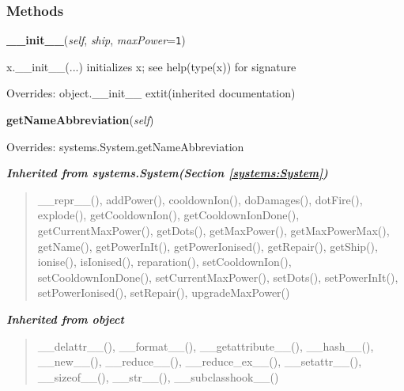   \subsubsection{Methods}

    \vspace{0.5ex}

\hspace{.8\funcindent}\begin{boxedminipage}{\funcwidth}

    \raggedright \textbf{\_\_init\_\_}(\textit{self}, \textit{ship}, \textit{maxPower}={\tt 1})

\setlength{\parskip}{2ex}
    x.\_\_init\_\_(...) initializes x; see help(type(x)) for signature

\setlength{\parskip}{1ex}
      Overrides: object.\_\_init\_\_ 	extit{(inherited documentation)}

    \end{boxedminipage}

    \vspace{0.5ex}

\hspace{.8\funcindent}\begin{boxedminipage}{\funcwidth}

    \raggedright \textbf{getNameAbbreviation}(\textit{self})

\setlength{\parskip}{2ex}
\setlength{\parskip}{1ex}
      Overrides: systems.System.getNameAbbreviation

    \end{boxedminipage}


\large{\textbf{\textit{Inherited from systems.System\textit{(Section \ref{systems:System})}}}}

\begin{quote}
\_\_repr\_\_(), addPower(), cooldownIon(), doDamages(), dotFire(), explode(), getCooldownIon(), getCooldownIonDone(), getCurrentMaxPower(), getDots(), getMaxPower(), getMaxPowerMax(), getName(), getPowerInIt(), getPowerIonised(), getRepair(), getShip(), ionise(), isIonised(), reparation(), setCooldownIon(), setCooldownIonDone(), setCurrentMaxPower(), setDots(), setPowerInIt(), setPowerIonised(), setRepair(), upgradeMaxPower()
\end{quote}

\large{\textbf{\textit{Inherited from object}}}

\begin{quote}
\_\_delattr\_\_(), \_\_format\_\_(), \_\_getattribute\_\_(), \_\_hash\_\_(), \_\_new\_\_(), \_\_reduce\_\_(), \_\_reduce\_ex\_\_(), \_\_setattr\_\_(), \_\_sizeof\_\_(), \_\_str\_\_(), \_\_subclasshook\_\_()
\end{quote}

